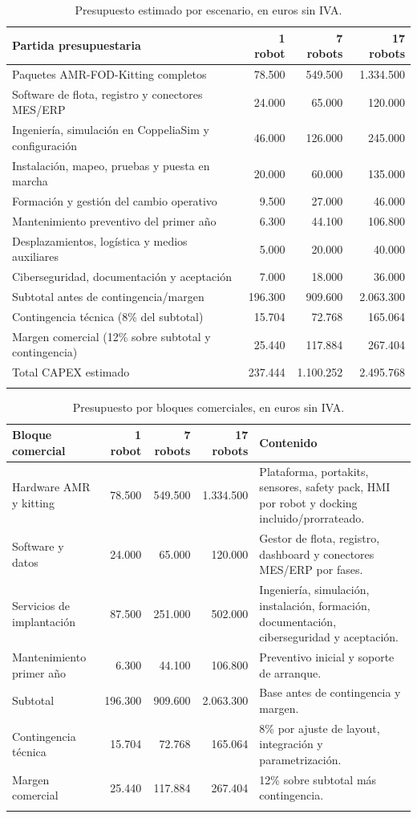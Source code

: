 \begin{longtable}{P{0.34\textwidth}r r r}
\toprule
Partida presupuestaria & 1 robot & 7 robots & 17 robots\\
\midrule
\endhead
Paquetes AMR-FOD-Kitting completos & 78.500 & 549.500 & 1.334.500\\
Software de flota, registro y conectores MES/ERP & 24.000 & 65.000 & 120.000\\
Ingeniería, simulación en CoppeliaSim y configuración & 46.000 & 126.000 & 245.000\\
Instalación, mapeo, pruebas y puesta en marcha & 20.000 & 60.000 & 135.000\\
Formación y gestión del cambio operativo & 9.500 & 27.000 & 46.000\\
Mantenimiento preventivo del primer año & 6.300 & 44.100 & 106.800\\
Desplazamientos, logística y medios auxiliares & 5.000 & 20.000 & 40.000\\
Ciberseguridad, documentación y aceptación & 7.000 & 18.000 & 36.000\\
\midrule
Subtotal antes de contingencia/margen & 196.300 & 909.600 & 2.063.300\\
Contingencia técnica (8\% del subtotal) & 15.704 & 72.768 & 165.064\\
Margen comercial (12\% sobre subtotal y contingencia) & 25.440 & 117.884 & 267.404\\
\midrule
Total CAPEX estimado & 237.444 & 1.100.252 & 2.495.768\\
\bottomrule
\caption{Presupuesto estimado por escenario, en euros sin IVA.}
\label{tab:presupuesto}
\end{longtable}

\begin{longtable}{P{0.34\textwidth}r r r P{0.20\textwidth}}
\toprule
Bloque comercial & 1 robot & 7 robots & 17 robots & Contenido\\
\midrule
\endhead
Hardware AMR y kitting & 78.500 & 549.500 & 1.334.500 & Plataforma, portakits, sensores, safety pack, HMI por robot y docking incluido/prorrateado.\\
Software y datos & 24.000 & 65.000 & 120.000 & Gestor de flota, registro, dashboard y conectores MES/ERP por fases.\\
Servicios de implantación & 87.500 & 251.000 & 502.000 & Ingeniería, simulación, instalación, formación, documentación, ciberseguridad y aceptación.\\
Mantenimiento primer año & 6.300 & 44.100 & 106.800 & Preventivo inicial y soporte de arranque.\\
\midrule
Subtotal & 196.300 & 909.600 & 2.063.300 & Base antes de contingencia y margen.\\
Contingencia técnica & 15.704 & 72.768 & 165.064 & 8\% por ajuste de layout, integración y parametrización.\\
Margen comercial & 25.440 & 117.884 & 267.404 & 12\% sobre subtotal más contingencia.\\
\bottomrule
\caption{Presupuesto por bloques comerciales, en euros sin IVA.}
\label{tab:presupuesto-bloques}
\end{longtable}

